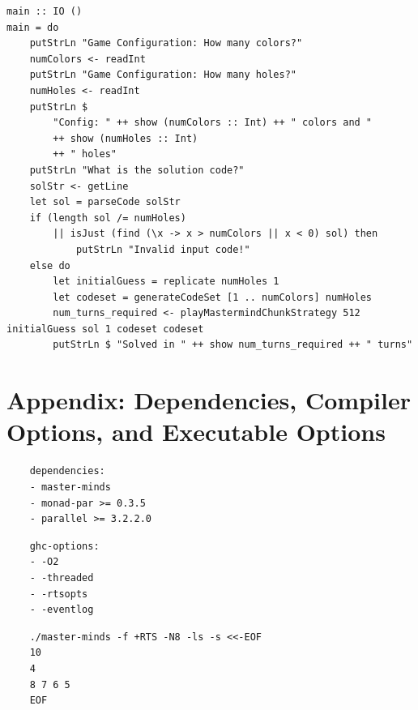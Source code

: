 \documentclass{article}
\begin{document}
\begin{verbatim}
main :: IO ()
main = do
    putStrLn "Game Configuration: How many colors?"
    numColors <- readInt
    putStrLn "Game Configuration: How many holes?"
    numHoles <- readInt
    putStrLn $
        "Config: " ++ show (numColors :: Int) ++ " colors and "
        ++ show (numHoles :: Int)
        ++ " holes"
    putStrLn "What is the solution code?"
    solStr <- getLine
    let sol = parseCode solStr
    if (length sol /= numHoles)
        || isJust (find (\x -> x > numColors || x < 0) sol) then 
            putStrLn "Invalid input code!"
    else do
        let initialGuess = replicate numHoles 1 
        let codeset = generateCodeSet [1 .. numColors] numHoles
        num_turns_required <- playMastermindChunkStrategy 512 initialGuess sol 1 codeset codeset
        putStrLn $ "Solved in " ++ show num_turns_required ++ " turns"
\end{verbatim}

\section{Appendix: Dependencies, Compiler Options, and Executable Options}
\begin{verbatim}
    dependencies: 
    - master-minds
    - monad-par >= 0.3.5
    - parallel >= 3.2.2.0
\end{verbatim}

\begin{verbatim}
    ghc-options:
    - -O2
    - -threaded
    - -rtsopts
    - -eventlog
\end{verbatim}

\begin{verbatim}
    ./master-minds -f +RTS -N8 -ls -s <<-EOF
    10
    4
    8 7 6 5
    EOF
\end{verbatim}
\end{document}
